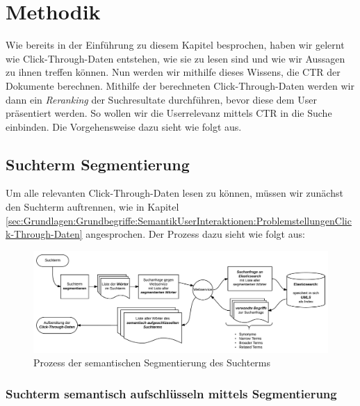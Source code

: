
\section{Methodik}
\label{sec:Reranking:Methodik}

Wie bereits in der Einführung zu diesem Kapitel besprochen, haben wir gelernt wie Click-Through-Daten entstehen, wie sie zu lesen sind und wie wir Aussagen zu ihnen treffen können. Nun werden wir mithilfe dieses Wissens, die CTR der Dokumente berechnen. Mithilfe der berechneten Click-Through-Daten werden wir dann ein \textit{Reranking} der Suchresultate durchführen, bevor diese dem User präsentiert werden. So wollen wir die Userrelevanz mittels CTR in die Suche einbinden. Die Vorgehensweise dazu sieht wie folgt aus.

\subsection{Suchterm Segmentierung}
\label{sec:Reranking:Methodik:SuchtermSegmentierung}

Um alle relevanten Click-Through-Daten lesen zu können, müssen wir zunächst den Suchterm auftrennen, wie in Kapitel \ref{sec:Grundlagen:Grundbegriffe:SemantikUserInteraktionen:ProblemstellungenClick-Through-Daten} angesprochen. Der Prozess dazu sieht wie folgt aus:

\begin{figure}[H]
\centering
\vspace{-1em}
\caption[Prozess der semantischen Segmentierung des Suchterms]{Prozess der semantischen Segmentierung des Suchterms}
\label{fig:SemantischeSegmentierung}
\includegraphics[width=\linewidth]{gfx/SuchtermSegmentierung}
\vspace{-2em}
\end{figure} 

\subsubsection{Suchterm semantisch aufschlüsseln mittels Segmentierung}
\label{sec:Reranking:Methodik:SuchtermSegmentierung:SuchtermSegmentierung}

